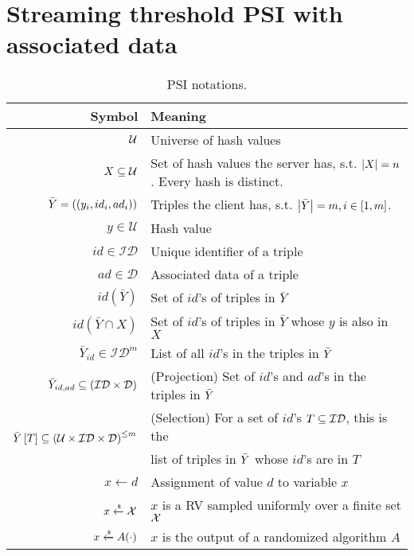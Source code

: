 
\section{Streaming threshold PSI with associated data} %
\label{sec:streaming_threshold_psi_with_associated_data}



\begin{table}[H]
\centering
	\begin{tabular}{r|l}
		\hline
		\hline
	

		\textbf{Symbol} & \textbf{Meaning} \\
		\hline
		\hline
		$\mathcal{U}$	& 	Universe of hash values\\
		$X \subseteq \mathcal{U}$	&Set of hash values the server has, s.t. $\left\lvert X\right\rvert = n$. Every hash is distinct.	  	\\
		$\bar{Y} = \left(\left(y_i, id_i, ad_i \right)\right)$	& Triples the client has, s.t. $\left\lvert\bar{Y}\right\rvert = m, i \in \left[1,m\right]$.	\\
		$y \in \mathcal{U}$	& 	Hash value\\
		$id \in \mathcal{ID}$	& 	Unique identifier of a triple\\
		$ad \in \mathcal{D}$	& 	Associated data of a triple\\
		$id(\bar{Y})$& Set of $id$'s of triples in $\bar{Y}$     \\

		$id(\bar{Y} \cap X)$& Set of $id$'s of triples in $\bar{Y}$ whose $y$ is also in $X$     \\
		$\bar{Y}_{id} \in \mathcal{ ID}^{m}$	& List of all $id$'s in the triples in $\bar{Y}$    \\
		$\bar{Y}_{id, ad} \subseteq \left(\mathcal{ID} \times \mathcal{D}\right) $ & (Projection) Set of $id$'s and $ad$'s in the triples in $\bar{Y}$  \\
		\multirow{2}{*}{$\bar{Y} \left[T\right]\subseteq \left(\mathcal{U} \times \mathcal{ID} \times \mathcal{D}\right)^{\leq m} $ }	&  (Selection) For a set of $id$'s $T \subseteq \mathcal{ID}$, this is the\\
			&    list of triples in $\bar{Y}$ whose $id$'s are in $T$  \\

		$x \gets d$	&   Assignment of value $d$ to variable $x$  \\
		$x \xleftarrow{\text{\tiny{\$}}} \mathcal{X}$	&   $x$ is a RV sampled uniformly over a finite set $\mathcal{X}$  \\
		$x \xleftarrow{\text{\tiny{\$}}} A (\cdot)$	&   $x$ is the output of a randomized algorithm $A$\\

		\hline
		\hline

	\end{tabular}
	\caption{PSI notations.}
	\label{tbl:noataions}
\end{table}
